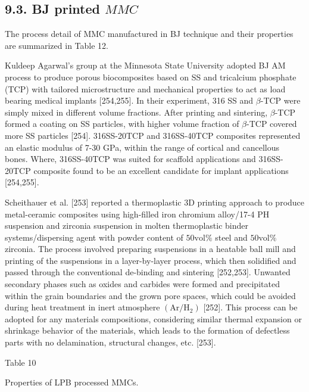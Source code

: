 \documentclass[10pt]{article}
\begin{document}
\subsection*{9.3. BJ printed $M M C$}
The process detail of MMC manufactured in BJ technique and their properties are summarized in Table 12.

Kuldeep Agarwal's group at the Minnesota State University adopted BJ AM process to produce porous biocomposites based on SS and tricalcium phosphate (TCP) with tailored microstructure and mechanical properties to act as load bearing medical implants [254,255]. In their experiment, 316 SS and $\beta$-TCP were simply mixed in different volume fractions. After printing and sintering, $\beta$-TCP formed a coating on SS particles, with higher volume fraction of $\beta$-TCP covered more SS particles [254]. 316SS-20TCP and 316SS-40TCP composites represented an elastic modulus of 7-30 GPa, within the range of cortical and cancellous bones. Where, 316SS-40TCP was suited for scaffold applications and 316SS-20TCP composite found to be an excellent candidate for implant applications [254,255].

Scheithauer et al. [253] reported a thermoplastic 3D printing approach to produce metal-ceramic composites using high-filled iron chromium alloy/17-4 PH suspension and zirconia suspension in molten thermoplastic binder systems/dispersing agent with powder content of $50 \mathrm{vol} \%$ steel and $50 \mathrm{vol} \%$ zirconia. The process involved preparing suspensions in a heatable ball mill and printing of the suspensions in a layer-by-layer process, which then solidified and passed through the conventional de-binding and sintering [252,253]. Unwanted secondary phases such as oxides and carbides were formed and precipitated within the grain boundaries and the grown pore spaces, which could be avoided during heat treatment in inert atmosphere $\left(\mathrm{Ar} / \mathrm{H}_{2}\right)$ [252]. This process can be adopted for any materials compositions, considering similar thermal expansion or shrinkage behavior of the materials, which leads to the formation of defectless parts with no delamination, structural changes, etc. [253].

Table 10

Properties of LPB processed MMCs.
\end{document}
